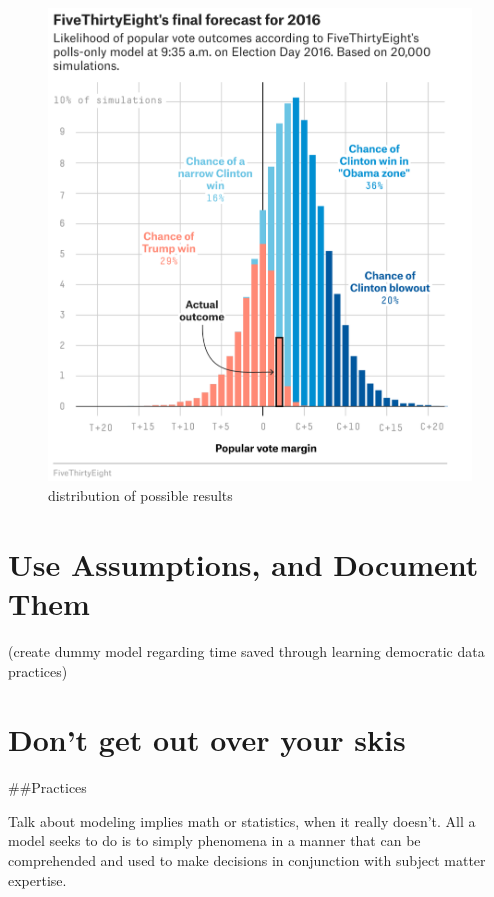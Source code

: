 \documentclass[]{book}
\begin{document}
\begin{figure}
\centering
\includegraphics{images/uncertain_dist.png}
\caption{distribution of possible results}
\end{figure}

\hypertarget{use-assumptions-and-document-them}{%
\section{Use Assumptions, and Document Them}\label{use-assumptions-and-document-them}}

(create dummy model regarding time saved through learning democratic data practices)

\hypertarget{dont-get-out-over-your-skis}{%
\section{Don't get out over your skis}\label{dont-get-out-over-your-skis}}

\#\#Practices

Talk about modeling implies math or statistics, when it really doesn't. All a model seeks to do is to simply phenomena in a manner that can be comprehended and used to make decisions in conjunction with subject matter expertise.
\end{document}
